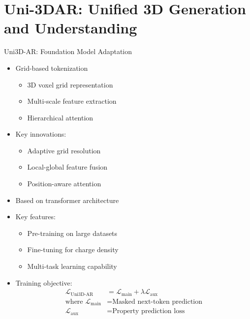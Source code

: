 \section{Uni-3DAR: Unified 3D Generation and Understanding}

\begin{frame}{Uni3D-AR: Foundation Model Adaptation}
    \begin{itemize}
        \item Grid-based tokenization
        \begin{itemize}
            \item 3D voxel grid representation
            \item Multi-scale feature extraction
            \item Hierarchical attention
        \end{itemize}
        \item Key innovations:
        \begin{itemize}
            \item Adaptive grid resolution
            \item Local-global feature fusion
            \item Position-aware attention
        \end{itemize}
        \item Based on transformer architecture
        \item Key features:
        \begin{itemize}
            \item Pre-training on large datasets
            \item Fine-tuning for charge density
            \item Multi-task learning capability
        \end{itemize}
        \item Training objective:
        \begin{align*}
            \mathcal{L}_{\text{Uni3D-AR}} &= \mathcal{L}_{\text{main}} + \lambda\mathcal{L}_{\text{aux}} \\
            \text{where } \mathcal{L}_{\text{main}} &= \text{Masked next-token prediction} \\
            \mathcal{L}_{\text{aux}} &= \text{Property prediction loss}
        \end{align*}
    \end{itemize}
\end{frame}


